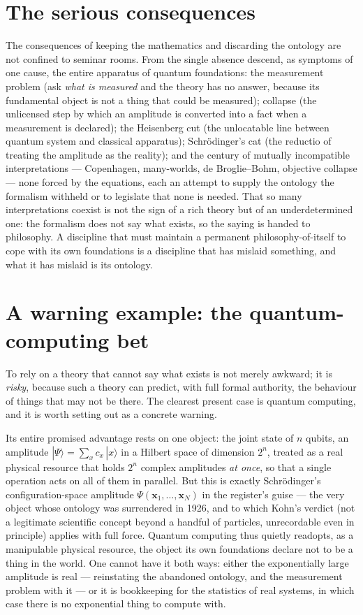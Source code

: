 \documentclass[11pt]{article}
\begin{document}
\section{The serious consequences}

The consequences of keeping the mathematics and discarding the ontology are not confined to seminar rooms. From
the single absence descend, as symptoms of one cause, the entire apparatus of quantum foundations: the
measurement problem (ask \emph{what is measured} and the theory has no answer, because its fundamental object is
not a thing that could be measured); collapse (the unlicensed step by which an amplitude is converted into a fact
when a measurement is declared); the Heisenberg cut (the unlocatable line between quantum system and classical
apparatus); Schr\"odinger's cat (the reductio of treating the amplitude as the reality); and the century of
mutually incompatible interpretations --- Copenhagen, many-worlds, de Broglie--Bohm, objective collapse --- none
forced by the equations, each an attempt to supply the ontology the formalism withheld or to legislate that none
is needed. That so many interpretations coexist is not the sign of a rich theory but of an underdetermined one:
the formalism does not say what exists, so the saying is handed to philosophy. A discipline that must maintain a
permanent philosophy-of-itself to cope with its own foundations is a discipline that has mislaid something, and
what it has mislaid is its ontology.

\section{A warning example: the quantum-computing bet}

To rely on a theory that cannot say what exists is not merely awkward; it is \emph{risky}, because such a theory
can predict, with full formal authority, the behaviour of things that may not be there. The clearest present case
is quantum computing, and it is worth setting out as a concrete warning.

Its entire promised advantage rests on one object: the joint state of $n$ qubits, an amplitude
$|\Psi\rangle=\sum_{x} c_x\,|x\rangle$ in a Hilbert space of dimension $2^n$, treated as a real physical resource
that holds $2^n$ complex amplitudes \emph{at once}, so that a single operation acts on all of them in parallel.
But this is exactly Schr\"odinger's configuration-space amplitude $\Psi(\mathbf x_1,\dots,\mathbf x_N)$ in the
register's guise --- the very object whose ontology was surrendered in 1926, and to which Kohn's verdict (not a
legitimate scientific concept beyond a handful of particles, unrecordable even in principle) applies with full
force. Quantum computing thus quietly readopts, as a manipulable physical resource, the object its own
foundations declare not to be a thing in the world. One cannot have it both ways: either the exponentially large
amplitude is real --- reinstating the abandoned ontology, and the measurement problem with it --- or it is
bookkeeping for the statistics of real systems, in which case there is no exponential thing to compute with.
\end{document}
